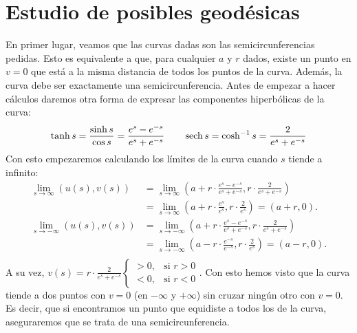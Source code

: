 \section{Estudio de posibles geodésicas}
En primer lugar, veamos que las curvas dadas son las semicircunferencias
pedidas. Esto es equivalente a que, para cualquier $a$ y $r$ dados, existe un
punto en $v = 0$ que está a la misma distancia de todos los puntos de la curva.
Además, la curva debe ser exactamente una semicircunferencia. Antes de empezar
a hacer cálculos daremos otra forma de expresar las componentes hiperbólicas de
la curva:
\[
\tanh s = \frac{\sinh s}{\cos s} = \frac{e^s - e^{-s}}{e^{s} + e^{-s}}\qquad
\operatorname{sech} s = \cosh^{-1} s = \frac{2}{e^s + e^{-s}}
\]
Con esto empezaremos calculando los límites de la curva cuando $s$ tiende a
infinito:
\begin{align*}
    \lim_{s \rightarrow \infty} \left( u\left( s \right), v\left( s \right)
    \right) &= \lim_{s \rightarrow \infty} \left( a + r \cdot \frac{e^s -
    e^{-s}}{e^s + e^{-s}}, r \cdot \frac{2}{e^s + e^{-s}} \right)\\
    &= \lim_{s \rightarrow \infty} \left( a + r \cdot \frac{e^s}{e^s}, r
    \cdot \frac{2}{e^s} \right) = \left( a + r, 0 \right).\\
    \lim_{s \rightarrow -\infty} \left( u\left( s \right), v\left( s \right)
    \right) &= \lim_{s \rightarrow -\infty} \left( a + r \cdot \frac{e^s -
    e^{-s}}{e^s + e^{-s}}, r \cdot \frac{2}{e^s + e^{-s}} \right)\\
    &= \lim_{s \rightarrow -\infty} \left( a - r \cdot \frac{e^{-s}}{e^{-s}}, r
    \cdot \frac{2}{e^s} \right) = \left( a - r, 0 \right).\\
\end{align*}
A su vez, $v\left( s \right) = r \cdot \frac{2}{e^s + e^{-s}} \begin{cases}
    > 0, &\text{si } r > 0\\
    < 0, &\text{si } r < 0
\end{cases}$. Con esto hemos visto que la curva tiende a dos puntos con $v = 0$ (en
$-\infty$ y $+\infty$) sin cruzar ningún otro con $v = 0$. Es decir, que si
encontramos un punto que equidiste a todos los de la curva, aseguraremos que se
trata de una semicircunferencia.

